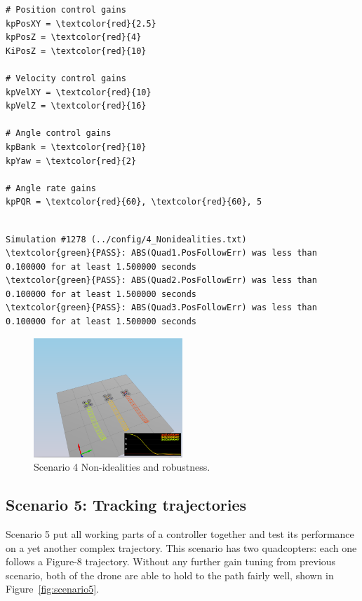 \documentclass[letterpaper]{article}
\begin{document}
\begin{Verbatim}[frame=single, commandchars=\\\{\}]
# Position control gains
kpPosXY = \textcolor{red}{2.5}
kpPosZ = \textcolor{red}{4}
KiPosZ = \textcolor{red}{10}

# Velocity control gains
kpVelXY = \textcolor{red}{10}
kpVelZ = \textcolor{red}{16}

# Angle control gains
kpBank = \textcolor{red}{10}
kpYaw = \textcolor{red}{2}

# Angle rate gains
kpPQR = \textcolor{red}{60}, \textcolor{red}{60}, 5
\end{Verbatim}

\begin{Verbatim}[frame=lines, label=Simulator Test Result Output, commandchars=\\\{\}]

Simulation #1278 (../config/4_Nonidealities.txt)
\textcolor{green}{PASS}: ABS(Quad1.PosFollowErr) was less than 0.100000 for at least 1.500000 seconds
\textcolor{green}{PASS}: ABS(Quad2.PosFollowErr) was less than 0.100000 for at least 1.500000 seconds
\textcolor{green}{PASS}: ABS(Quad3.PosFollowErr) was less than 0.100000 for at least 1.500000 seconds
\end{Verbatim}

\begin{figure}[ht]
\centering
\includegraphics[width=0.5\textwidth]{./fig/scenario4.png}
\caption{\label{fig:scenario4} Scenario 4 Non-idealities and robustness.}
\end{figure}

\subsection{Scenario 5: Tracking trajectories}

Scenario 5 put all working parts of a controller together and test its performance on a yet another complex trajectory. This scenario has two quadcopters: each one follows a Figure-8 trajectory. Without any further gain tuning from previous scenario, both of the drone are able to hold to the path fairly well, shown in Figure~\ref{fig:scenario5}.
\end{document}
